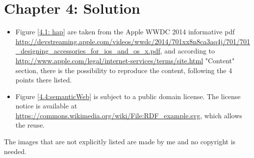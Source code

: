 \section*{Chapter 4: Solution}
\begin{itemize}

	\item Figure \ref{4.1: hap} are taken from the Apple WWDC 2014 informative pdf \url{http://devstreaming.apple.com/videos/wwdc/2014/701xx8n8ca3aq4j/701/701_designing_accessories_for_ios_and_os_x.pdf}, and according to \url{http://www.apple.com/legal/internet-services/terms/site.html} "Content" section, there is the possibility to reproduce the content, following the 4 points there listed.
	
	\item Figure \ref{4.4:semanticWeb} is subject to a public domain license. The license notice is available at \url{https://commons.wikimedia.org/wiki/File:RDF_example.svg}, which allows the reuse.
	
\end{itemize}
	

%

The images that are not explicitly listed are made by me and no copyright is needed.
 
